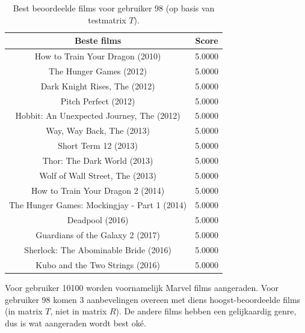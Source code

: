 \begin{table}[H]
\centering
\begin{tabular}{c|c}
\textbf{Beste films} & \textbf{Score} \\
\hline
How to Train Your Dragon (2010)             & 5.0000 \\
The Hunger Games (2012)                     & 5.0000 \\
Dark Knight Rises, The (2012)               & 5.0000 \\
Pitch Perfect (2012)                        & 5.0000 \\
Hobbit: An Unexpected Journey, The (2012)   & 5.0000 \\
Way, Way Back, The (2013)                   & 5.0000 \\
Short Term 12 (2013)                        & 5.0000 \\
Thor: The Dark World (2013)                 & 5.0000 \\
Wolf of Wall Street, The (2013)             & 5.0000 \\
How to Train Your Dragon 2 (2014)           & 5.0000 \\
The Hunger Games: Mockingjay - Part 1 (2014)& 5.0000 \\
Deadpool (2016)                             & 5.0000 \\
Guardians of the Galaxy 2 (2017)            & 5.0000 \\
Sherlock: The Abominable Bride (2016)       & 5.0000 \\
Kubo and the Two Strings (2016)             & 5.0000
\end{tabular}
\caption{Best beoordeelde films voor gebruiker 98 (op basis van testmatrix $T$).}
\label{fig:op18c}
\end{table}

\noindent Voor gebruiker 10100 worden voornamelijk Marvel films aangeraden. Voor gebruiker 98 komen 3 aanbevelingen overeen met diens hoogst-beoordeelde films (in matrix $T$, niet in matrix $R$). De andere films hebben een gelijkaardig genre, dus is wat aangeraden wordt best ok\'e.\\


